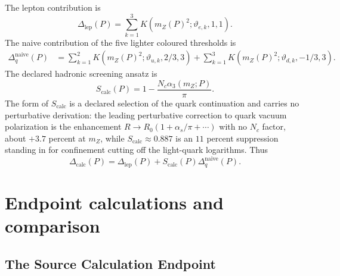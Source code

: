 \documentclass[11pt]{article}
\theoremstyle{remark}
\newcommand{\Dcalc}{\Delta_{\mathrm{calc}}}
\newcommand{\Dlep}{\Delta_{\mathrm{lep}}}
\newcommand{\Nc}{N_c}
\begin{document}
The lepton contribution is
\begin{equation}
\Dlep(P)=
\sum_{k=1}^3K(m_Z(P)^2;\vartheta_{e,k},1,1).
\label{eq:Dlep}
\end{equation}
The naive contribution of the five lighter coloured thresholds is
\begin{align}
\Delta_q^{\mathrm{naive}}(P)
&=
\sum_{k=1}^2K(m_Z(P)^2;\vartheta_{u,k},2/3,3)
+\sum_{k=1}^3K(m_Z(P)^2;\vartheta_{d,k},-1/3,3).
\label{eq:Dqnaive}
\end{align}
The declared hadronic screening ansatz is
\begin{equation}
S_{\mathrm{calc}}(P)=
1-\frac{\Nc\alpha_3(m_Z;P)}{\pi}.
\label{eq:Scalc}
\end{equation}
The form of \(S_{\mathrm{calc}}\) is a declared selection of the quark
continuation and carries no perturbative derivation: the leading perturbative
correction to quark vacuum polarization is the enhancement
\(R\to R_0(1+\alpha_s/\pi+\cdots)\) with no \(\Nc\) factor, about \(+3.7\)
percent at \(m_Z\), while \(S_{\mathrm{calc}}\approx0.887\) is an \(11\)
percent suppression standing in for confinement cutting off the light-quark
logarithms.
Thus
\begin{equation}
\Dcalc(P)
=
\Dlep(P)+S_{\mathrm{calc}}(P)\Delta_q^{\mathrm{naive}}(P).
\label{eq:Dcalc}
\end{equation}


\section{Endpoint calculations and comparison}
\subsection{The Source Calculation Endpoint}
\label{sec:alpha-step-15}
\end{document}
